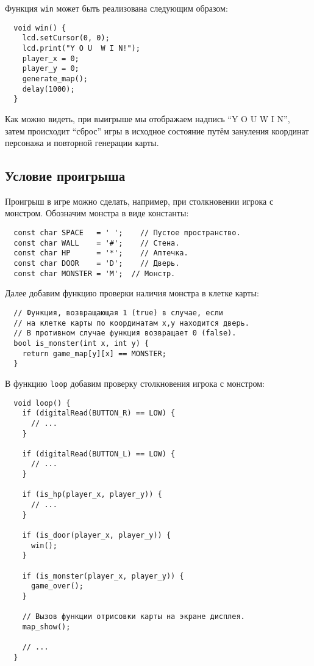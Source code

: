 \documentclass[../sparc.tex]{subfiles}
\begin{document}
Функция \texttt{win} может быть реализована следующим образом:

\begin{verbatim}
  void win() {
    lcd.setCursor(0, 0);
    lcd.print("Y O U  W I N!");
    player_x = 0;
    player_y = 0;
    generate_map();
    delay(1000);
  }
\end{verbatim}

Как можно видеть, при выигрыше мы отображаем надпись ``Y O U  W I N'', затем
происходит ``сброс'' игры в исходное состояние путём зануления координат
персонажа и повторной генерации карты.

\subsection{Условие проигрыша}

Проигрыш в игре можно сделать, например, при столкновении игрока с монстром.
Обозначим монстра в виде константы:

\begin{verbatim}
  const char SPACE   = ' ';    // Пустое пространство.
  const char WALL    = '#';    // Стена.
  const char HP      = '*';    // Аптечка.
  const char DOOR    = 'D';    // Дверь.
  const char MONSTER = 'M';  // Монстр.
\end{verbatim}

Далее добавим функцию проверки наличия монстра в клетке карты:

\begin{verbatim}
  // Функция, возвращающая 1 (true) в случае, если
  // на клетке карты по координатам x,y находится дверь.
  // В противном случае функция возвращает 0 (false).
  bool is_monster(int x, int y) {
    return game_map[y][x] == MONSTER;
  }
\end{verbatim}

В функцию \texttt{loop} добавим проверку столкновения игрока с монстром:

\begin{verbatim}
  void loop() {
    if (digitalRead(BUTTON_R) == LOW) {
      // ...
    }

    if (digitalRead(BUTTON_L) == LOW) {
      // ...
    }

    if (is_hp(player_x, player_y)) {
      // ...
    }

    if (is_door(player_x, player_y)) {
      win();
    }

    if (is_monster(player_x, player_y)) {
      game_over();
    }

    // Вызов функции отрисовки карты на экране дисплея.
    map_show();

    // ...
  }
\end{verbatim}
\end{document}
